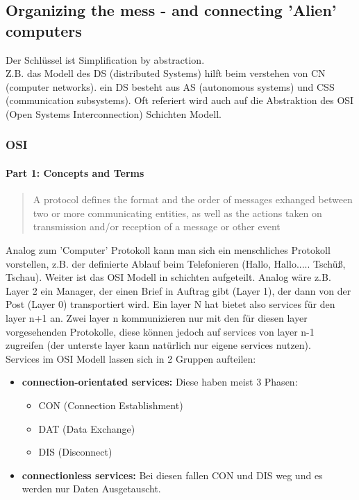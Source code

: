    \subsection{Organizing the mess - and connecting 'Alien' computers}
        Der Schlüssel ist \frQuo Simplification by abstraction\frQuc. \\
        Z.B. das Modell des DS (distributed Systems) hilft beim verstehen von CN (computer networks). ein DS besteht aus AS (autonomous systems) und CSS (communication subsystems). Oft referiert wird auch auf die Abstraktion des OSI (Open Systems Interconnection) Schichten Modell.
        \subsubsection{OSI}
            \paragraph{Part 1: Concepts and Terms}
                \begin{quote}
                    \frQuo A protocol defines the format and the order of messages exhanged between two or more communicating entities, as well as the actions taken on transmission and/or reception of a message or other event\frQuc
                \end{quote}
                Analog zum 'Computer' Protokoll kann man sich ein menschliches Protokoll vorstellen, z.B. der definierte Ablauf beim Telefonieren (Hallo, Hallo..... Tschüß, Tschau).
                Weiter ist das OSI Modell in schichten aufgeteilt. Analog wäre z.B. Layer 2 ein Manager, der einen Brief in Auftrag gibt (Layer 1), der dann von der Post (Layer 0) transportiert wird. Ein layer N hat bietet also services für den layer n+1 an. Zwei layer n kommunizieren nur mit den für diesen layer vorgesehenden Protokolle, diese können jedoch auf services von layer n-1 zugreifen (der unterste layer kann natürlich nur eigene services nutzen). \\
                Services im OSI Modell lassen sich in 2 Gruppen aufteilen:
                \begin{itemize}
                    \item \textbf{connection-orientated services:}
                        Diese haben meist 3 Phasen: 
                        \begin{itemize}
                            \item CON (Connection Establishment)
                            \item DAT (Data Exchange)
                            \item DIS (Disconnect)
                        \end{itemize}
                    \item \textbf{connectionless services:}
                        Bei diesen fallen CON und DIS weg und es werden nur Daten Ausgetauscht. 
                \end{itemize}
